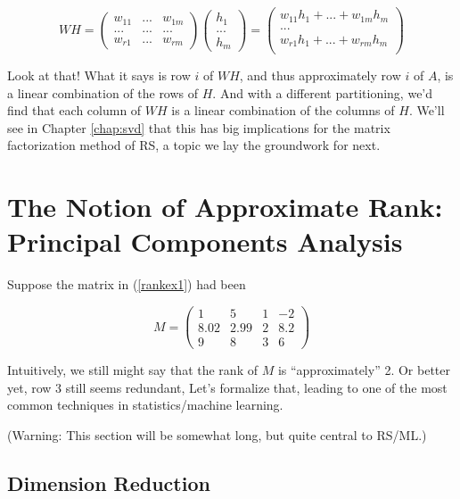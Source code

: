 \begin{equation}
WH =
\left (
\begin{array}{ccc}
w_{11} & ... & w_{1m}\\
... & ... & ... \\
w_{r1} & ... & w_{rm}
\end{array}
\right )
\left (
\begin{array}{cc}
h_1 \\
... \\
h_m 
\end{array}
\right )
=
\left (
\begin{array}{cc}
w_{11}h_1 + ... + w_{1m} h_m \\
... \\
w_{r1}h_1 + ... + w_{rm} h_m \\
\end{array}
\right )
\end{equation}

Look at that!  What it says is row $i$ of $WH$, and thus approximately
row $i$ of $A$, is a linear combination of the rows of $H$.  And with a
different partitioning, we'd find that each column of $WH$ is a linear
combination of the columns of $H$.  We'll see in Chapter \ref{chap:svd}
that this has big implications for the matrix factorization method of
RS, a topic we lay the groundwork for next.

\section{The Notion of Approximate Rank:  Principal Components
Analysis}

Suppose the matrix in (\ref{rankex1}) had been

\begin{equation}
\label{rankex2}
M =
\left (
\begin{array}{rrrr}
1 & 5 & 1 & -2\\
8.02 & 2.99 & 2 & 8.2\\
9 & 8 & 3 & 6 
\end{array}
\right )
\end{equation}

Intuitively, we still might say that the rank of $M$ is ``approximately'' 2.
Or better yet, row 3 still seems redundant, Let's formalize that,
leading to one of the most common techniques in statistics/machine
learning.

(Warning:  This section will be somewhat long, but quite central to
RS/ML.)

\subsection{Dimension Reduction}

